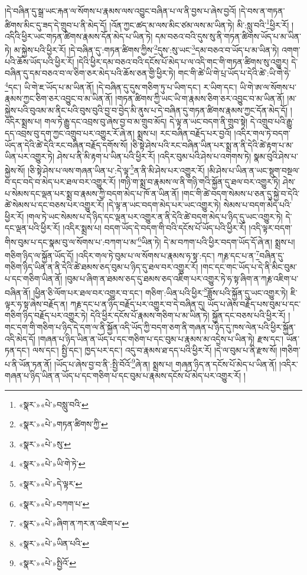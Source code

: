 །དེ་བཞིན་དུ་སྒྲ་ཡང་རྐན་ལ་སོགས་པ་རྣམས་ལས་འབྱུང་བཞིན་པ་ལ་ནི་བྱས་པ་ཞེས་བྱའོ། །དེ་བས་ན་གཏན་ཚིགས་མིང་དུ་ཟད་དེ་གྲུབ་པ་ནི་མེད་དོ། །འོན་ཀྱང་ཚད་མ་ལས་མིང་ཙམ་ལས་མ་ཡིན་ཏེ། མི་:སླུ་བའི་\footnote{«སྣར་»«པེ་»བསླུ་བའི་}ཕྱིར་རོ། །འདིའི་ཕྱིར་ཡང་གཏན་ཚིགས་རྣམས་དོན་མེད་པ་ཡིན་ཏེ། དམ་བཅའ་བའི་དུས་སུ་ནི་གཏན་ཚིགས་ཡོད་པ་མ་ཡིན་ཏེ། མ་སྐྱེས་པའི་ཕྱིར་རོ། །དེ་བཞིན་དུ་:གཏན་ཚིགས་ཀྱིས་\footnote{«སྣར་»«པེ་»གཏན་ཚིགས་ཀྱི་}དུས་:སུ་ཡང་\footnote{«སྣར་»«པེ་»སུ་}དམ་བཅའ་བ་ཡོད་པ་མ་ཡིན་ཏེ། འགག་པའི་ཆོས་ཡོད་པའི་ཕྱིར་རོ། །དེའི་ཕྱིར་དམ་བཅའ་བའི་དངོས་པོ་མེད་པ་ལ་འདི་གང་གི་གཏན་ཚིགས་སུ་འགྱུར། དེ་བཞིན་དུ་དམ་བཅའ་བ་ལ་ཅིག་ཅར་མེད་པའི་ཆོས་ཅན་གྱི་ཕྱིར་ཏེ། གང་གི་ཚེ་ཡི་གེ་པྲ་ཡོད་པ་དེའི་ཚེ་:ཡི་གེ་ཧེ་\footnote{«སྣར་»«པེ་»ཡི་གེ་ཏེ་}དང་། ཡི་གེ་ཇ་ཡོད་པ་མ་ཡིན་ནོ། །དེ་བཞིན་དུ་དུས་གཅིག་ཏུ་པ་ཡིག་དང་། ར་ཡིག་དང་། ཡི་གེ་ཨ་ལ་སོགས་པ་རྣམས་ཀྱང་ཅིག་ཅར་འབྱུང་བ་མ་ཡིན་ནོ། །གཏན་ཚིགས་ཀྱི་ཡང་ཡི་ག་རྣམས་ཅིག་ཅར་འབྱུང་བ་མ་ཡིན་ནོ། །མ་སྐྱེས་པའི་བུའམ་མ་ནིང་པའི་བུས་བུའི་བྱ་བ་བྱེད་མི་ནུས་པ་དེ་བཞིན་དུ་གཏན་ཚིགས་རྣམས་ཀྱང་དོན་མེད་དོ། །འདིར་སྨྲས་པ། གལ་ཏེ་རྒྱུ་དང་འབྲས་བུ་ཞེས་བྱ་བ་མ་གྲུབ་མོད། དེ་ལྟ་ན་ཡང་བདག་ནི་གྲུབ་སྟེ། དེ་འགྲུབ་པའི་རྒྱུ་དད་འབྲས་བུ་དག་ཀྱང་འགྲུབ་པར་འགྱུར་རོ་ཞེ་ན། སྨྲས་པ། རང་བཞིན་བརྗོད་པར་བྱའོ། །འདིར་གལ་ཏེ་བདག་ཡོད་ན་དེའི་ཚེ་དེའི་རང་བཞིན་བརྗོད་དགོས་སོ། །ཅི་སྟེ་ཤེས་པའི་རང་བཞིན་ཡིན་པར་སྨྲ་ན་ནི་དེའི་ཚེ་རྟག་པ་མ་ཡིན་པར་འགྱུར་ཏེ། ཤེས་པ་ནི་མི་རྟག་པ་ཡིན་པའི་ཕྱིར་རོ། །འདིར་བུམ་པའི་ཤེས་པ་འགགས་ཏེ། སྣམ་བུའི་ཤེས་པ་སྐྱེས་སོ། །ཅི་སྟེ་ཤེས་པ་ལས་གཞན་ཡིན་པ་:དེ་ལྟ་\footnote{«སྣར་»«པེ་»དེ་ལྟར་}ན་ནི་མི་ཤེས་པར་འགྱུར་རོ། །མི་ཤེས་པ་ཡིན་ན་ཡང་སྡུག་བསྔལ་བ་དང་བདེ་བ་མེད་པར་ཐལ་བར་འགྱུར་རོ། །གཉི་ག་སྨྲ་བ་རྣམས་ལ་ནི་གཉི་གའི་སྐྱོན་དུ་ཐལ་བར་འགྱུར་ཏེ། ཤེས་པ་སེམས་དང་ལྡན་པར་སྨྲ་བ་རྣམས་ཀྱི་བདག་མེད་པ་ཁོ་ན་ཡིན་ནོ། །གང་གི་ཚེ་བདག་སེམས་པ་ཅན་དུ་སྐྱེ་བ་དེའི་ཚེ་སེམས་པ་དང་བཅས་པར་འགྱུར་རོ། །དེ་ལྟ་ན་ཡང་བདག་མེད་པར་ཡང་འགྱུར་ཏེ། སེམས་པ་བདག་མེད་པའི་ཕྱིར་རོ། །གལ་ཏེ་ཡང་སེམས་པ་དེ་ཉིད་དང་ལྡན་པར་འགྱུར་ན་ནི་དེའི་ཚེ་བདག་མེད་པ་ཉིད་དུ་ཡང་འགྱུར་ཏེ། དེ་དང་ལྡན་པའི་ཕྱིར་རོ། །འདིར་སྨྲས་པ། བདག་ཡོད་དེ་བདག་གི་བའི་དངོས་པོ་ཡོད་པའི་ཕྱིར་རོ། །འདི་ལྟར་བདག་གིས་བུམ་པ་དང་སྣམ་བུ་ལ་སོགས་པ་:བཀག་པ་མ་\footnote{«སྣར་»«པེ་»བཀག་པ་}ཡིན་ཏེ། དེ་མ་བཀག་པའི་ཕྱིར་བདག་ཡོད་དོ་ཞེ་ན། སྨྲས་པ། གཅིག་ཉིད་ལ་སྐྱོན་ཡོད་དོ། །འདིར་གལ་ཏེ་བུམ་པ་ལ་སོགས་པ་རྣམས་ཧ་སྟ་:དང་། ཀརྞ་དང་པ་ན་\footnote{«སྣར་»«པེ་»ཞིག་ན་ཀར་ན་འཇིག་པ་}བཞིན་དུ་གཅིག་ཉིད་ཡིན་ན་ནི་དེའི་ཚེ་ཐམས་ཅད་བུམ་པ་ཉིད་དུ་ཐལ་བར་འགྱུར་རོ། །གང་དང་གང་ཡོད་པ་དེ་ནི་མིང་བུམ་པ་དང་གཅིག་ཡིན་ནོ། །བུམ་པ་ཞིག་ན་ཐམས་ཅད་དུ་ཐམས་ཅད་འཇིག་པར་འགྱུར་ཏེ་ཧ་སྟ་ཞིག་ན་ཀརྞ་འཇིག་པ་བཞིན་ནོ། །ཕྱིན་ཅི་ལོག་པར་ཐལ་བར་འགྱུར་བ་དང་། གཅིག་:ཡིན་པའི་ཕྱིར་\footnote{«སྣར་»«པེ་»ཡིན་པའི་}ཟློས་པའི་སྐྱོན་དུ་ཡང་འགྱུར་ཏེ། ཇི་ལྟར་ཧ་སྟ་ཞེས་བརྗོད་ན། ཀརྞ་དང་པ་ན་ཉིད་བརྗོད་པར་འགྱུར་བ་དེ་བཞིན་དུ། ཡོད་པ་ཞེས་བརྗོད་པས་བུམ་པ་དང་གཅིག་ཉིད་བརྗོད་པར་འགྱུར་ཏེ། དེའི་ཕྱིར་དངོས་པོ་རྣམས་གཅིག་པ་མ་ཡིན་ཏེ། སྐྱོན་དང་བཅས་པའི་ཕྱིར་རོ། །གང་དག་གི་གཅིག་པ་ཉིད་དེ་དག་ལ་ནི་སྐྱོན་འདི་ཡོད་ཀྱི་བདག་ཅག་ནི་གཞན་པ་ཉིད་དུ་ཁས་ལེན་པའི་ཕྱིར་སྐྱོན་འདི་མེད་དོ། །གཞན་པ་ཉིད་ཡིན་ན་ཡོད་པ་དང་གཅིག་པ་དང་བུམ་པ་རྣམས་མ་འདྲེས་པ་ཡིན་ཏེ། རྫས་དང་། ཡོན་ཏན་དང་། ལས་དང་། སྤྱི་དང་། ཁྱད་པར་དང་། འདུ་བ་རྣམས་ཐ་དད་པའི་ཕྱིར་རོ། །དེ་ལ་བུམ་པ་ནི་རྫས་སོ། །གཅིག་པ་ནི་ཡོན་ཏན་ནོ། །ཡོད་པ་ཞེས་བྱ་བ་ནི་:སྤྱི་བོའོ་\footnote{«སྣར་»«པེ་»སྤྱིའོ་}ཞེ་ན། སྨྲས་པ། གཞན་ཉིད་ན་དངོས་པོ་མེད་པ་ཡིན་ནོ། །འདིར་གཞན་པ་ཉིད་ཡིན་ན་ཡོད་པ་དང་གཅིག་པ་དང་བུམ་པ་རྣམས་དངོས་པོ་མེད་པར་འགྱུར་རོ། །
